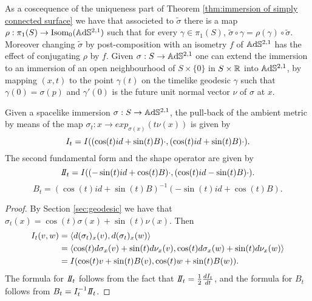 As a coscequence of the uniqueness part of Theorem \ref{thm:immersion of simply connected surface} we have that associeted to $\widetilde{\sigma}$ there is a map $\rho:\pi_1(S) \to \text{Isom}_0(\mathbb{A}\mathrm{d}\mathbb{S}^{2,1})$ such that for every $\gamma \in \pi_1(S)$, $\widetilde{\sigma} \circ \gamma = \rho(\gamma) \circ \widetilde{\sigma}$.
Moreover changing $\widetilde{\sigma}$ by post-composition with an isometry $f$ of $\mathbb{A}\mathrm{d}\mathbb{S}^{2,1}$ has the effect of conjugating $\rho$ by $f$.
Given $\sigma:S \to \mathbb{A}\mathrm{d}\mathbb{S}^{2,1}$ one can extend the immersion to an immersion of an open neighbourhood of $S \times\{0\}$ in $S\times\mathbb{R}$ into $\mathbb{A}\mathrm{d}\mathbb{S}^{2,1}$, by mapping $(x,t)$ to the point $\gamma(t)$ on the timelike geodesic $\gamma$ such that $\gamma(0)=\sigma(p)$ and $\gamma'(0)$ is the future unit normal vector $\nu$ of $\sigma$ at $x$.

\begin{lemma}\label{lem:tub metric}
    Given a spacelike immersion $\sigma:S\to \mathbb{A}\mathrm{d}\mathbb{S}^{2,1}$, the pull-back of the ambient metric by means of the map $\sigma_t : x \to exp_{\sigma(x)}(t\nu(x))$ is given by 
    \[
        I_t = I((\cos(t) id + \sin(t) B)\cdot, (\cos(t) id + \sin(t) B)\cdot).
    \]
    The second fundamental form and the shape operator are given by
    \[
        \II_t = \I((-\sin(t) id + \cos(t) B)\cdot, (\cos(t) id - \sin(t) B)\cdot).
    \]
    \[
        B_t = (\cos(t) id + \sin(t) B)^{-1}(-\sin(t) id + \cos(t) B).
    \]
\end{lemma}

\begin{proof}
    By Section \ref{sec:geodesic} we have that $\sigma_t(x) = \cos(t)\sigma(x) + \sin(t) \nu(x)$.
    Then
    \[
    \begin{split}
        I_t (v,w)& = \langle d(\sigma_t)_x (v), d(\sigma_t)_x (w) \rangle \\
        & = \langle \cos(t)d\sigma_x (v) + \sin(t)d\nu_x (v), \cos(t)d\sigma_x (w) + \sin(t)d\nu_x (w) \rangle \\
        & = I(\cos(t) v + \sin(t) B(v), \cos(t) w + \sin(t) B(w) ).
    \end{split}
    \]
    The formula for $\II_t$ follows from the fact that $\II_t = \frac{1}{2} \frac{d \I_t}{d t}$, and the formula for $B_t$ follows from $B_t = I_t^{-1} \II_t$. 
\end{proof}


